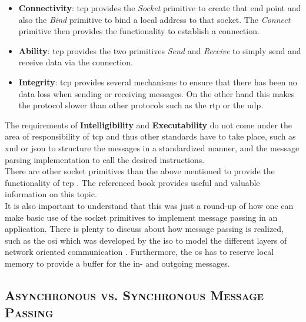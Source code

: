 \documentclass[xcolor=dvipsnames]{article}
\begin{document}
\begin{itemize}

\item \textbf{Connectivity}: \gls{tcp} provides the \textit{Socket} primitive to create that end point and also the \textit{Bind} primitive to bind a local address to that socket. The \textit{Connect} primitive then provides the functionality to establish a connection.

\item \textbf{Ability}: \gls{tcp} provides the two primitives \textit{Send} and \textit{Receive} to simply send and receive data via the connection.

\item \textbf{Integrity}: \gls{tcp} provides several mechanisms to ensure that there has been no data loss when sending or receiving messages. On the other hand this makes the protocol slower than other protocols such as the \gls{rtp} or the \gls{udp}.

\end{itemize}

\noindent The requirements of \textbf{Intelligibility} and \textbf{Executability} do not come under the area of responsibility of \gls{tcp} and thus other standards have to take place, such as \gls{xml} or \gls{json} to structure the messages in a standardized manner, and the message parsing implementation to call the desired instructions.\\

\noindent There are other socket primitives than the above mentioned to provide the functionality of \gls{tcp} \cite[ch. 4.3.1 on p. 141]{tanenbaum}. The referenced book \cite{tanenbaum} provides useful and valuable information on this topic.\\

\noindent It is also important to understand that this was just a round-up of how one can make basic use of the socket primitives to implement message passing in an application. There is plenty to discuss about how message passing is realized, such as the \gls{osi} which was developed by the \gls{iso} to model the different layers of network oriented communication \cite[ch. 4.1.1 on p. 116]{tanenbaum}. Furthermore, the \gls{os} has to reserve local memory to provide a buffer for the in- and outgoing messages.

\subsection{\scshape{Asynchronous vs. Synchronous Message Passing}}
\end{document}
